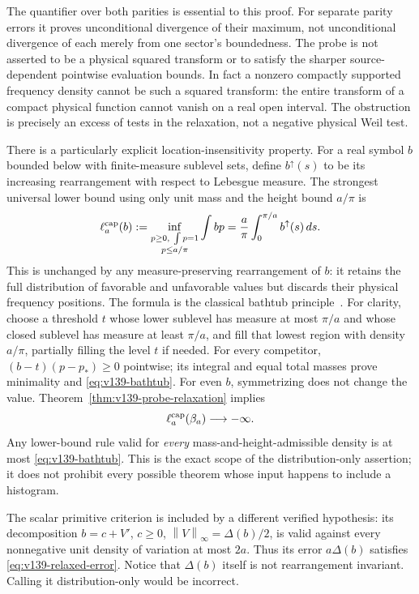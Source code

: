 \documentclass[11pt]{article}
\theoremstyle{remark}
\newcommand{\norm}[1]{\left\lVert #1\right\rVert}
\begin{document}
The quantifier over both parities is essential to this proof.
For separate parity errors it proves unconditional divergence of
their maximum, not unconditional divergence of each merely from
one sector's boundedness. The probe is not asserted to be a physical
squared transform or to satisfy the sharper source-dependent
pointwise evaluation bounds. In fact a nonzero compactly supported
frequency density cannot be such a squared transform: the entire
transform of a compact physical function cannot vanish on a real
open interval. The obstruction is precisely an excess of tests
in the relaxation, not a negative physical Weil test.

There is a particularly explicit location-insensitivity property.
For a real symbol $b$ bounded below with finite-measure sublevel sets,
define $b^\uparrow(s)$ to be its increasing rearrangement with respect
to Lebesgue measure. The strongest universal lower bound using only
unit mass and the height bound $a/\pi$ is
\begin{equation}\label{eq:v139-bathtub}
 \ell_a^{\rm cap}(b):=
 \inf_{\substack{p\ge0,\ \int p=1\\p\le a/\pi}}
        \int bp
 =\frac a\pi\int_0^{\pi/a} b^\uparrow(s)\,ds.
\end{equation}
This is unchanged by any measure-preserving rearrangement of $b$:
it retains the full distribution of favorable and unfavorable values
but discards their physical frequency positions. The formula is the
classical bathtub principle~\cite[Section 1.14]{LiebLoss2001}.
For clarity, choose a threshold $t$ whose lower sublevel has measure
at most $\pi/a$ and whose closed sublevel has measure at least
$\pi/a$, and fill that lowest region with density $a/\pi$, partially
filling the level $t$ if needed. For every competitor,
$(b-t)(p-p_*)\ge0$ pointwise; its integral and equal total masses
prove minimality and \eqref{eq:v139-bathtub}.
For even $b$, symmetrizing does not change the value.
Theorem~\ref{thm:v139-probe-relaxation} implies
\begin{equation}\label{eq:v139-cap-divergence}
 \ell_a^{\rm cap}(\beta_a)\longrightarrow-\infty.
\end{equation}
Any lower-bound rule valid for \emph{every} mass-and-height-admissible
density is at most \eqref{eq:v139-bathtub}. This is the exact scope of
the distribution-only assertion; it does not prohibit every possible
theorem whose input happens to include a histogram.

The scalar primitive criterion is included by a different verified
hypothesis: its decomposition $b=c+V'$, $c\ge0$,
$\norm V_\infty=\Delta(b)/2$, is valid against every nonnegative
unit density of variation at most $2a$. Thus its error $a\Delta(b)$
satisfies \eqref{eq:v139-relaxed-error}. Notice that $\Delta(b)$
itself is not rearrangement invariant. Calling it distribution-only
would be incorrect.
\end{document}
